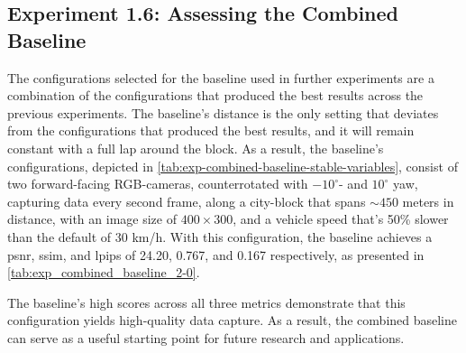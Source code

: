 \subsection{Experiment 1.6: Assessing the Combined Baseline} \label{sec:exp-combined-baseline}
The configurations selected for the baseline used in further experiments are a combination of the configurations that produced the best results across the previous experiments. The baseline’s distance is the only setting that deviates from the configurations that produced the best results, and it will remain constant with a full lap around the block. As a result, the baseline's configurations, depicted in \autoref{tab:exp-combined-baseline-stable-variables}, consist of two forward-facing RGB-cameras, counterrotated with $-10^\circ$- and $10^\circ$ yaw, capturing data every second frame, along a city-block that spans $\sim450$ meters in distance, with an image size of $400 \times 300$, and a vehicle speed that's 50\% slower than the default of 30 km/h. With this configuration, the baseline achieves a \acrshort{psnr}, \acrshort{ssim}, and \acrshort{lpips} of 24.20, 0.767, and 0.167 respectively, as presented in \autoref{tab:exp_combined_baseline_2-0}.

The baseline's high scores across all three metrics demonstrate that this configuration yields high-quality data capture. As a result, the combined baseline can serve as a useful starting point for future research and applications.


